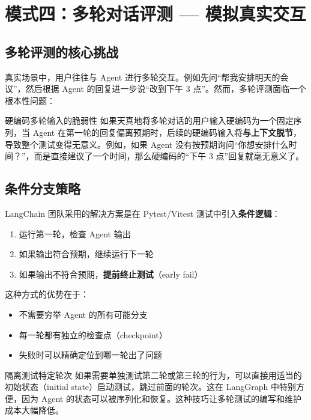 \section{模式四：多轮对话评测 --- 模拟真实交互}

\subsection{多轮评测的核心挑战}

真实场景中，用户往往与 Agent 进行多轮交互。例如先问``帮我安排明天的会议''，然后根据 Agent 的回复进一步说``改到下午 3 点''。然而，多轮评测面临一个根本性问题：

\begin{warningbox}{硬编码多轮输入的脆弱性}
如果天真地将多轮对话的用户输入硬编码为一个固定序列，当 Agent 在第一轮的回复偏离预期时，后续的硬编码输入将\textbf{与上下文脱节}，导致整个测试变得无意义。例如，如果 Agent 没有按预期询问``你想安排什么时间？''，而是直接建议了一个时间，那么硬编码的``下午 3 点''回复就毫无意义了。
\end{warningbox}

\subsection{条件分支策略}

LangChain 团队采用的解决方案是在 Pytest/Vitest 测试中引入\textbf{条件逻辑}：

\begin{enumerate}
  \item 运行第一轮，检查 Agent 输出
  \item 如果输出符合预期，继续运行下一轮
  \item 如果输出不符合预期，\textbf{提前终止测试}（early fail）
\end{enumerate}

这种方式的优势在于：
\begin{itemize}
  \item 不需要穷举 Agent 的所有可能分支
  \item 每一轮都有独立的检查点（checkpoint）
  \item 失败时可以精确定位到哪一轮出了问题
\end{itemize}

\begin{knowledgebox}{隔离测试特定轮次}
如果需要单独测试第二轮或第三轮的行为，可以直接用适当的初始状态（initial state）启动测试，跳过前面的轮次。这在 LangGraph 中特别方便，因为 Agent 的状态可以被序列化和恢复。这种技巧让多轮测试的编写和维护成本大幅降低。
\end{knowledgebox}

